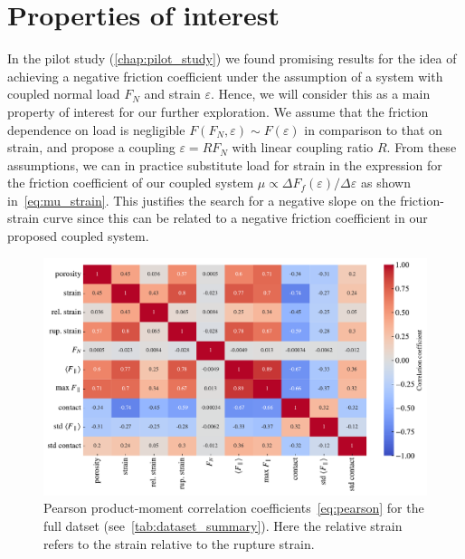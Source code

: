  

\section{Properties of interest} 
In the pilot study (\cref{chap:pilot_study}) we found promising results for the idea of achieving a negative friction coefficient under the assumption of a system with coupled normal load $F_N$ and strain $\varepsilon$. Hence, we will consider this as a main property of interest for our further exploration. We assume that the friction dependence on load is negligible $F(F_N, \varepsilon) \sim F(\varepsilon)$ in comparison to that on strain, and propose a coupling $\varepsilon = R F_N$ with linear coupling ratio $R$. From these assumptions, we can in practice substitute load for strain in the expression for the friction coefficient of our coupled system $\mu \propto \Delta F_f(\varepsilon) / \Delta \varepsilon$ as shown in~\cref{eq:mu_strain}. This justifies the search for a negative slope on the friction-strain curve since this can be related to a negative friction coefficient in our proposed coupled system. 



\begin{figure}[H]
  \centering
  \includegraphics[width=0.81\linewidth]{figures/ML/corrcoef_matrix.pdf}
  \caption{Pearson product-moment correlation coefficients~\cref{eq:pearson} for the full datset (see~\cref{tab:dataset_summary}). Here the relative strain refers to the strain relative to the rupture strain. }
  \label{fig:corrcoef_matrix}
\end{figure}


